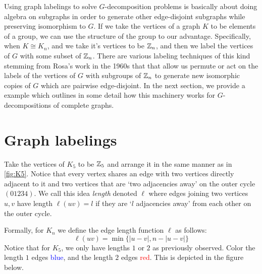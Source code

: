 Using graph labelings to solve $G$-decomposition problems is basically about doing algebra on subgraphs in order to generate other edge-disjoint subgraphs while preserving isomorphism to $G$. If we take the vertices of a graph $K$ to be elements of a group, we can use the structure of the group to our advantage. Specifically, when $K\cong K_{n}$, and we take it's vertices to be $\mathbb{Z}_{n}$, and then we label the vertices of $G$ with some subset of $\mathbb{Z}_{n}$. There are various labeling techniques of this kind stemming from Rosa's work in the 1960s that that allow us permute or act on the labels of the vertices of $G$ with subgroups of $\mathbb{Z}_{n}$ to generate new isomorphic copies of $G$ which are pairwise edge-disjoint. In the next section, we provide a example which outlines in some detail how this machinery works for $G$-decompositions of complete graphs.
\section{Graph labelings}

Take the vertices of $K_{5}$ to be $\mathbb{Z}_{5}$ and arrange it in the same manner as in \ref{fig:K5}. Notice that every vertex shares an edge with two vertices directly adjacent to it and two vertices that are `two adjacencies away' on the outer cycle $(01234)$. We call this idea \textit{length} denoted $\ell$ where edges joining two vertices $u,v$ have length $\ell(uv)=l$ if they are `$l$ adjacencies away' from each other on the outer cycle. 

Formally, for $K_{n}$ we define the edge length function $\ell$ as follows:
$$\ell(uv)=\min\{|u-v|,n-|u-v|\}$$
Notice that for $K_{5}$, we only have lengths $1$ or $2$ as previously observed. Color the length $1$ edges \textcolor{blue}{blue}, and the length $2$ edges \textcolor{red}{red}. This is depicted in the figure below.

